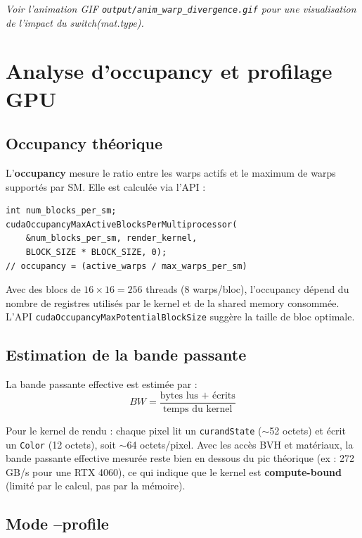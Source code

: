 \documentclass[12pt,a4paper]{article}
\begin{document}
\textit{Voir l'animation GIF \texttt{output/anim\_warp\_divergence.gif} pour une visualisation de l'impact du switch(mat.type).}

\section{Analyse d'occupancy et profilage GPU}

\subsection{Occupancy théorique}

L'\textbf{occupancy} mesure le ratio entre les warps actifs et le maximum de warps
supportés par SM. Elle est calculée via l'API :

\begin{lstlisting}[caption={Calcul d'occupancy via l'API CUDA}]
int num_blocks_per_sm;
cudaOccupancyMaxActiveBlocksPerMultiprocessor(
    &num_blocks_per_sm, render_kernel,
    BLOCK_SIZE * BLOCK_SIZE, 0);
// occupancy = (active_warps / max_warps_per_sm)
\end{lstlisting}

Avec des blocs de $16 \times 16 = 256$ threads (8 warps/bloc), l'occupancy
dépend du nombre de registres utilisés par le kernel et de la shared memory consommée.
L'API \texttt{cudaOccupancyMaxPotentialBlockSize} suggère la taille de bloc optimale.

\subsection{Estimation de la bande passante}

La bande passante effective est estimée par :
\[
BW = \frac{\text{bytes lus + écrits}}{\text{temps du kernel}}
\]

Pour le kernel de rendu : chaque pixel lit un \texttt{curandState} ($\sim$52 octets)
et écrit un \texttt{Color} (12 octets), soit $\sim$64 octets/pixel.
Avec les accès BVH et matériaux, la bande passante effective mesurée reste
bien en dessous du pic théorique (ex : 272 GB/s pour une RTX 4060),
ce qui indique que le kernel est \textbf{compute-bound} (limité par le calcul,
pas par la mémoire).

\subsection{Mode --profile}
\end{document}
